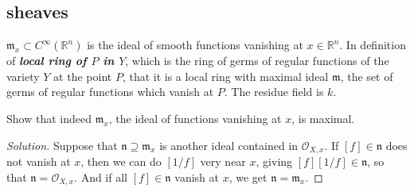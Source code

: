 \subsection{sheaves}

\(\mathfrak{m}_x \subset C^\infty(\mathbb{R}^n)\) is the ideal of smooth functions vanishing at \(x \in \mathbb{R}^n\). In \cite{hart} definition of \textit{\textbf{local ring of \(P\) in \(Y\)}}, which is the ring of germs of regular functions of the variety \(Y\) at the point \(P\), that it is a local ring with maximal ideal \(\mathfrak{m}\), the set of germs of regular functions which vanish at \(P\). The residue field is \(k\).

\begin{exercise}\leavevmode
Show that indeed \(\mathfrak{m}_x\), the ideal of functions vanishing at \(x\), is maximal.
\end{exercise}
\begin{proof}[Solution]\leavevmode
	Suppose that \(\mathfrak{n} \supseteq \mathfrak{m}_x\) is another ideal contained in \(\mathcal{O}_{X,x}\). If \([f] \in \mathfrak{n}\) does not vanish at \(x\), then we can do \([1/f]\) very near  \(x\), giving \([f][1/f] \in \mathfrak{n}\), so that \(\mathfrak{n}=\mathcal{O}_{X,x}\). And if all \([f] \in \mathfrak{n}\) vanish at \(x\), we get \(\mathfrak{n}=\mathfrak{m}_x\).
\end{proof}

